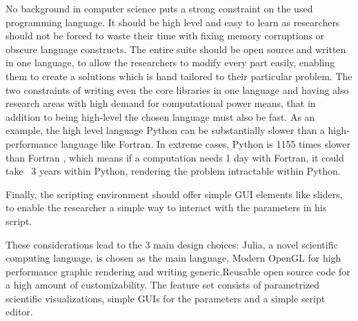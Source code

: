 No background in computer science puts a strong constraint on the used programming language. It should be high level and easy to learn as researchers should not be forced to waste their time with fixing memory corruptions or obscure language constructs.
The entire suite should be open source and written in one language, to allow the researchers to modify every part easily, enabling them to create a solutions which is hand tailored to their particular problem.
The two constraints of writing even the core libraries in one language and having also research areas with high demand for computational power means, that in addition to being high-level the chosen language must also be fast.
As an example, the high level language Python can be substantially slower than a high-performance language like Fortran.
In extreme cases, Python is 1155 times slower than Fortran \cite{benchmark_python}, which means if a computation needs 1 day with Fortran, it could take ~3 years within Python, rendering the problem intractable within Python.

Finally, the scripting environment should offer simple GUI elements like sliders, to enable the researcher a simple way to interact with the parameters in his script.

These considerations lead to the 3 main design choices:
Julia, a novel scientific computing language, is chosen as the main language, Modern OpenGL for high performance graphic rendering and writing generic,Reusable open source code for a high amount of customizability.
The feature set consists of parametrized scientific visualizations, simple GUIs for the parameters and a simple script editor.


\pagebreak
